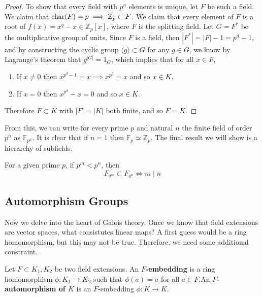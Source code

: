 \begin{proof}
    To show that every field with $p^n$ elements is unique, let $F$ be such a field. We claim that $\Char(F) = p \implies \mathbb{Z}_p \subset F$. We claim that every element of $F$ is a root of $f(x) = x^q - x \in \mathbb{Z}_p [x]$, where $F$ is the splitting field. Let $G = F^\ast$ be the multiplicative group of units. Since $F$ is a field, then $|F^\ast| = |F| - 1 = p^d - 1$, and by constructing the cyclic group $\langle g \rangle \subset G$ for any $g \in G$, we know by Lagrange's theorem that $g^{|G|} = 1_G$, which implies that for all $x \in F$, 
    \begin{enumerate}
      \item If $x \neq 0$ then $x^{p^d - 1} = x \implies x^{p^d} = x$ and so $x \in K$. 
      \item If $x = 0$ then $x^{p^d} - x = 0$ and so $x \in K$. 
    \end{enumerate}
    Therefore $F \subset K$ with $|F| = |K|$ both finite, and so $F = K$. 
  \end{proof} 

  From this, we can write for every prime $p$ and natural $n$ the finite field of order $p^n$ as $\mathbb{F}_{p^n}$. It is clear that if $n = 1$ then $\mathbb{F}_p \simeq \mathbb{Z}_p$. The final result we will show is a hierarchy of subfields. 

  \begin{theorem}
    For a given prime $p$, if $p^m < p^n$, then 
    \begin{equation}
      F_{q^m} \subset F_{q^n} \iff m \mid n
    \end{equation}
  \end{theorem}

\subsection{Automorphism Groups} 

  Now we delve into the heart of Galois theory. Once we know that field extensions are vector spaces, what consistutes linear maps? A first guess would be a ring homomorphism, but this may not be true. Therefore, we need some additional constraint. 

  \begin{definition}
    Let $F \subset K_1, K_2$ be two field extensions. An \textbf{$F$-embedding} is a ring homomorphism $\phi: K_1 \to K_2$ such that $\phi(a) = a$ for all $a \in F$.An \textbf{$F$-automorphism of $K$} is an $F$-embedding $\phi: K \to K$. 
  \end{definition}

